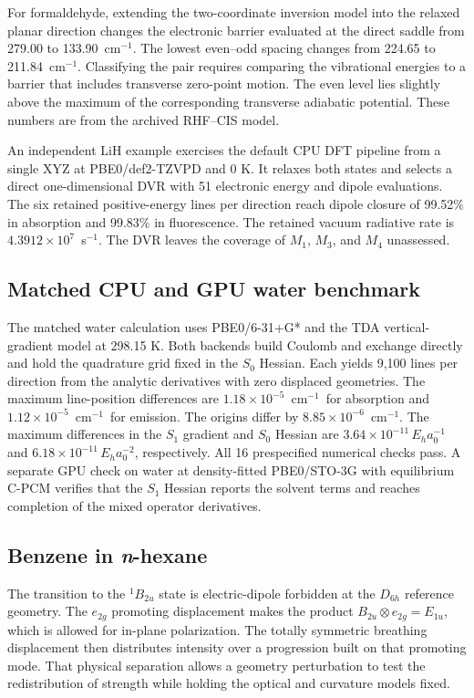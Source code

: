 \documentclass[11pt]{article}
\newcommand{\wn}{\ensuremath{\mathrm{cm}^{-1}}}
\begin{document}
For formaldehyde, extending the two-coordinate inversion model into the relaxed planar direction changes the electronic barrier evaluated at the direct saddle from 279.00 to 133.90~\wn. The lowest even--odd spacing changes from 224.65 to 211.84~\wn. Classifying the pair requires comparing the vibrational energies to a barrier that includes transverse zero-point motion. The even level lies slightly above the maximum of the corresponding transverse adiabatic potential. These numbers are from the archived RHF--CIS model.

An independent LiH example exercises the default CPU DFT pipeline from a single XYZ at PBE0/def2-TZVPD and 0 K. It relaxes both states and selects a direct one-dimensional DVR with 51 electronic energy and dipole evaluations. The six retained positive-energy lines per direction reach dipole closure of 99.52\% in absorption and 99.83\% in fluorescence. The retained vacuum radiative rate is $4.3912\times10^7$~s$^{-1}$. The DVR leaves the coverage of $M_1$, $M_3$, and $M_4$ unassessed.

\subsection{Matched CPU and GPU water benchmark}

The matched water calculation uses PBE0/6-31+G* and the TDA vertical-gradient model at 298.15 K. Both backends build Coulomb and exchange directly and hold the quadrature grid fixed in the $S_0$ Hessian. Each yields 9,100 lines per direction from the analytic derivatives with zero displaced geometries. The maximum line-position differences are $1.18\times10^{-5}$~\wn\ for absorption and $1.12\times10^{-5}$~\wn\ for emission. The origins differ by $8.85\times10^{-6}$~\wn. The maximum differences in the $S_1$ gradient and $S_0$ Hessian are $3.64\times10^{-11}\,E_h a_0^{-1}$ and $6.18\times10^{-11}\,E_h a_0^{-2}$, respectively. All 16 prespecified numerical checks pass. A separate GPU check on water at density-fitted PBE0/STO-3G with equilibrium C-PCM verifies that the $S_1$ Hessian reports the solvent terms and reaches completion of the mixed operator derivatives.

\subsection{Benzene in \emph{n}-hexane}

The transition to the $^{1}B_{2u}$ state is electric-dipole forbidden at the $D_{6h}$ reference geometry. The $e_{2g}$ promoting displacement makes the product $B_{2u}\otimes e_{2g}=E_{1u}$, which is allowed for in-plane polarization. The totally symmetric breathing displacement then distributes intensity over a progression built on that promoting mode. That physical separation allows a geometry perturbation to test the redistribution of strength while holding the optical and curvature models fixed.
\end{document}
